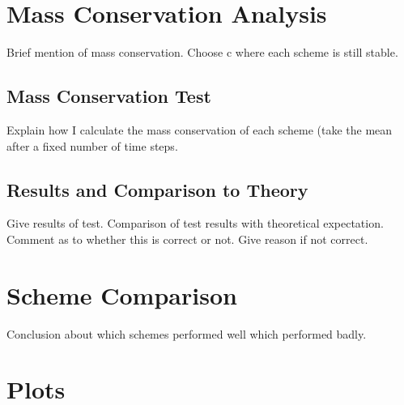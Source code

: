 \documentclass[11pt]{article}
\begin{document}
\section{Mass Conservation Analysis}

Brief mention of mass conservation. Choose c where each scheme is still stable. 

\subsection{Mass Conservation Test}

Explain how I calculate the mass conservation of each scheme (take the mean after a fixed number of time steps.

\subsection{Results and Comparison to Theory}
Give results of test. Comparison of test results with theoretical expectation. Comment as to whether this is correct or not. Give reason if not correct.

\section{Scheme Comparison}

Conclusion about which schemes performed well which performed badly.

\section{Plots}
 
\end{document}

